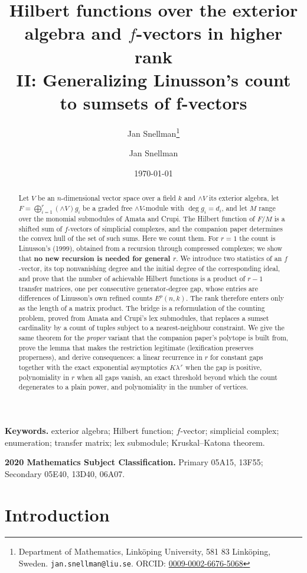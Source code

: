\documentclass[11pt, a4paper, abstract=yes]{scrartcl}
\author{Jan Snellman\thanks{Department of Mathematics, Linköping University, 581 83 Linköping, Sweden. \texttt{jan.snellman@liu.se}. ORCID: \href{https://orcid.org/0009-0002-6676-5068}{0009-0002-6676-5068}}}
\author{Jan Snellman \orcidlink{0009-0002-6676-5068}}
\date{\today}
\title{Hilbert functions over the exterior algebra and \(f\)-vectors in higher rank\\\medskip
\large II: Generalizing Linusson's count to sumsets of f-vectors}
\theoremstyle{definition}
\theoremstyle{remark}
\theoremstyle{plain}
\newcommand{\Ext}{\mathord{\wedge }V}
\begin{document}
\maketitle
\begin{abstract}
Let \(V\) be an \(n\)-dimensional vector space over a field \(k\) and \(\Ext\) its exterior algebra,
let \(F=\bigoplus_{i=1}^{r}(\Ext)g_i\) be a graded free \(\Ext\)-module with \(\deg g_i=d_i\), and let \(M\)
range over the monomial submodules of Amata and Crupi. The Hilbert function of \(F/M\) is a shifted
sum of \(f\)-vectors of simplicial complexes, and the companion paper \autocite{SnellmanArticle1} determines the convex hull of the
set of such sums. Here we count them. For \(r=1\) the count is Linusson's (1999), obtained from a
recursion through compressed complexes; we show that \textbf{no new recursion is needed for general
\(r\)}. We introduce two statistics of an \(f\)-vector, its top nonvanishing degree and the initial
degree of the corresponding ideal, and prove that the number of achievable Hilbert functions is a
product of \(r-1\) transfer matrices, one per consecutive generator-degree gap, whose entries are
differences of Linusson's own refined counts \(E^p(n,k)\). The rank therefore enters only as the
length of a matrix product. The bridge is a reformulation of the counting problem, proved from
Amata and Crupi's lex submodules, that replaces a sumset cardinality by a count of tuples subject to
a nearest-neighbour constraint. We give the same theorem for the \emph{proper} variant that the companion
paper's polytope is built from, prove the lemma that makes the restriction legitimate (lexification
preserves properness), and derive consequences: a linear recurrence in \(r\) for
constant gaps together with the exact exponential asymptotics \(K\lambda^{\,r}\) when the gap is
positive, polynomiality in \(r\) when all gaps vanish, an exact threshold beyond which the count
degenerates to a plain power, and polynomiality in the number of vertices.
\end{abstract}

\medskip\noindent\textbf{Keywords.} exterior algebra; Hilbert function; \(f\)-vector; simplicial
complex; enumeration; transfer matrix; lex submodule; Kruskal--Katona theorem.

\smallskip\noindent\textbf{2020 Mathematics Subject Classification.} Primary 05A15, 13F55;
Secondary 05E40, 13D40, 06A07.
\medskip

\setcounter{tocdepth}{2}
\tableofcontents
\section{Introduction}
\label{sec-intro}
\end{document}
